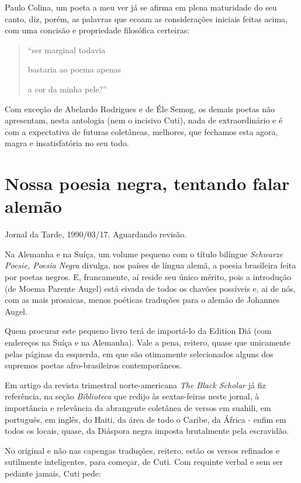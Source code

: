 \documentclass[
  letterpaper,
  DIV=11,
  numbers=noendperiod]{scrreprt}
\begin{document}
Paulo Colina, um poeta a meu ver já se afirma em plena maturidade do seu
canto, diz, porém, as palavras que ecoam as considerações iniciais
feitas acima, com uma concisão e propriedade filosófica certeiras:

\begin{quote}
``ser marginal todavia~

bastaria ao poema apenas~

a cor da minha pele?''
\end{quote}

Com exceção de Abelardo Rodrigues e de Éle Semog, os demais poetas não
apresentam, nesta antologia (nem o incisivo Cuti), nada de
extraordinário e é com a expectativa de futuras coletâneas, melhores,
que fechamos esta agora, magra e insatisfatória no seu todo.

\chapter{Nossa poesia negra, tentando falar
alemão}\label{nossa-poesia-negra-tentando-falar-alemuxe3o}

Jornal da Tarde, 1990/03/17. Aguardando revisão.

\hfill\break

Na Alemanha e na Suíça, um volume pequeno com o título bilíngue
\emph{Schwarze Poesie, Poesia Negra} divulga, nos países de língua
alemã, a poesia brasileira feita por poetas negros. E, francamente, aí
reside seu único mérito, pois a introdução (de Moema Parente Augel) está
eivada de todos os chavões possíveis e, ai de nós, com as mais
prosaicas, menos poéticas traduções para o alemão de Johannes Augel.

Quem procurar este pequeno livro terá de importá-lo da Edition Diá (com
endereços na Suíça e na Alemanha). Vale a pena, reitero, quase que
unicamente pelas páginas da esquerda, em que são otimamente selecionados
alguns dos supremos poetas afro-brasileiros contemporâneos.

Em artigo da revista trimestral norte-americana \emph{The Black Scholar}
já fiz referência, na seção \emph{Biblioteca} que redijo às
sextas-feiras neste jornal, à importância e relevância da abrangente
coletânea de versos em suahili, em português, em inglês, do Haiti, da
área de todo o Caribe, da África - enfim em todos os locais, quase, da
Diáspora negra imposta brutalmente pela escravidão.

No original e não nas capengas traduções, reitero, estão os versos
refinados e sutilmente inteligentes, para começar, de Cuti. Com requinte
verbal e sem ser pedante jamais, Cuti pede:
\end{document}
